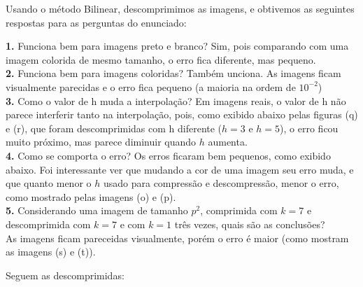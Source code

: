 \documentclass[12pt,letterpaper]{article}
\begin{document}
	Usando o método Bilinear, descomprimimos as imagens, e obtivemos as seguintes respostas para as perguntas do enunciado:
	
	\textbf{1.} Funciona bem para imagens preto e branco?
	Sim, pois comparando com uma imagem colorida de mesmo tamanho, o erro fica diferente, mas pequeno.\\
	
	\textbf{2.} Funciona bem para imagens coloridas?
	Também unciona. As imagens ficam visualmente parecidas e o erro fica pequeno (a maioria na ordem de $10^{-2}$)\\
	
	\textbf{3.} Como o valor de h muda a interpolação? 
	Em imagens reais, o valor de h não parece interferir tanto na interpolação, pois, como exibido abaixo pelas figuras (q) e (r), que foram descomprimidas com h diferente ($h = 3$ e $h = 5$), o erro ficou muito próximo, mas parece diminuir quando $h$ aumenta.\\
	
	\textbf{4.} Como se comporta o erro?
	Os erros ficaram bem pequenos, como exibido abaixo. Foi interessante ver que mudando a cor de uma imagem seu erro muda, e que quanto menor o $h$ usado para compressão e descompressão, menor o erro, como mostrado pelas imagens (o) e (p). \\
	
	\textbf{5.} Considerando uma imagem de tamanho $p^2$, comprimida com $k = 7$ e descomprimida com $k = 7$ e com $k = 1$ três vezes, quais são as conclusões?\\
	As imagens ficam pareceidas visualmente, porém o erro é maior (como mostram as imagens (s) e (t)).
	
	Seguem as descomprimidas:
	
	\begin{figure}[h]
	\end{figure}
	
	\begin{figure}[h]
	\end{figure}
	
\end{document}
